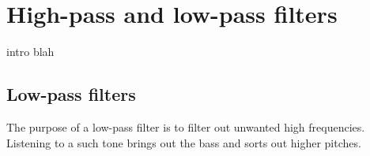 \chapter{High-pass and low-pass filters}
intro blah

\section{Low-pass filters}
The purpose of a low-pass filter is to filter out unwanted high frequencies. Listening to a such tone brings out the bass and sorts out higher pitches. 